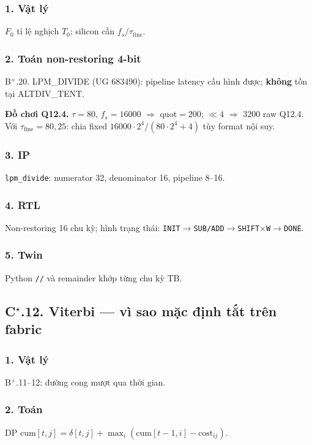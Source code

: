 \subsubsection*{1. Vật lý} $F_0$ tỉ lệ nghịch $T_0$; silicon cần $f_s/\tau_{\mathrm{fine}}$.

\subsubsection*{2. Toán non-restoring 4-bit} B$^+$.20. LPM\_DIVIDE (UG 683490): pipeline latency cấu hình được; \textbf{không} tồn tại ALTDIV\_TENT.

\noindent\textbf{Đồ chơi Q12.4.} $\tau=80$, $f_s=16000$ $\Rightarrow$ quot$=200$; $\ll4$ $\Rightarrow$ $3200$ raw Q12.4. Với $\tau_{\mathrm{fine}}=80{,}25$: chia fixed $16000\cdot2^{4}/(80\cdot2^{4}+4)$ tùy format nội suy.

\subsubsection*{3. IP} \texttt{lpm\_divide}: numerator 32, denominator 16, pipeline 8--16.

\subsubsection*{4. RTL} Non-restoring 16 chu kỳ; hình trạng thái: \texttt{INIT$\to$SUB/ADD$\to$SHIFT$\times$W$\to$DONE}.

\subsubsection*{5. Twin} Python \texttt{//} và remainder khớp từng chu kỳ TB.

\subsection*{C$^\star$.12. Viterbi --- vì sao mặc định tắt trên fabric}

\subsubsection*{1. Vật lý} B$^+$.11--12: đường cong mượt qua thời gian.

\subsubsection*{2. Toán} DP $\mathrm{cum}[t,j]=\delta[t,j]+\max_i(\mathrm{cum}[t-1,i]-\mathrm{cost}_{ij})$.

